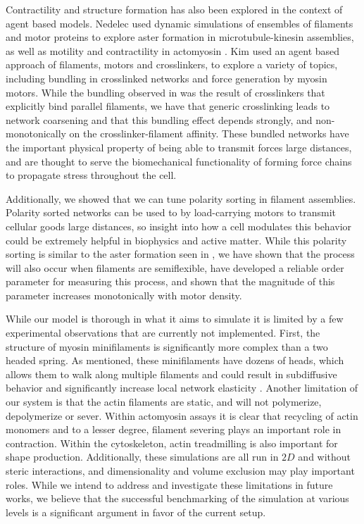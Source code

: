 \documentclass[12pt]{article} \usepackage{times} \usepackage{graphicx}
\begin{document}
\par Contractility and structure formation has also been explored in the
context of agent based models.  Nedelec used dynamic simulations of ensembles
of filaments and motor proteins to explore aster formation in
microtubule-kinesin assemblies, as well as motility and contractility in
actomyosin \cite{nedelec2002,nedelec2007,ennomani2016}.  Kim used an agent
based approach of filaments, motors and crosslinkers, to explore a variety of
topics, including bundling in crosslinked networks and force generation by
myosin motors\cite{kim2009b, kim2014}.  While the bundling observed in
\cite{kim2009b} was the result of crosslinkers that explicitly bind parallel
filaments, we have that generic crosslinking leads to network coarsening and
that this bundling effect depends strongly, and non-monotonically on the
crosslinker-filament affinity. These bundled networks have the important
physical property of being able to transmit forces large distances, and are
thought to serve the biomechanical functionality of forming force chains to
propagate stress throughout the cell. 

\par Additionally, we showed that we can tune polarity sorting in filament
assemblies.  Polarity sorted networks can be used to by load-carrying motors to
transmit cellular goods large distances, so insight into how a cell modulates
this behavior could be extremely helpful in biophysics and active matter. While
this polarity sorting is similar to the aster formation seen in
\cite{nedelec2002,gordon2012}, we have shown that the process will also occur
when filaments are semiflexible, have developed a reliable order parameter for
measuring this process, and shown that the magnitude of this parameter
increases monotonically with motor density. 

\par While our model is thorough in what it aims to simulate it is limited by a
few experimental observations that are currently not implemented. First, the
structure of myosin minifilaments is significantly more complex than a two
headed spring. As mentioned, these minifilaments have dozens of heads, which
allows them to walk along multiple filaments and could result in subdiffusive
behavior \cite{scholz2016} and significantly increase local network elasticity
\cite{murrellTalk}.  Another limitation of our system is that the actin
filaments are static, and will not polymerize, depolymerize or sever. Within
actomyosin assays it is clear that recycling of actin monomers and to a lesser
degree, filament severing plays an important role in
contraction\cite{murrell2012}. Within the cytoskeleton, actin treadmilling is
also important for shape production. Additionally, these simulations are all
run in $2D$ and without steric interactions, and dimensionality and volume
exclusion may play important roles.  While we intend to address and investigate
these limitations in future works, we believe that the successful benchmarking
of the simulation at various levels is a significant argument in favor of the
current setup.
\end{document}
